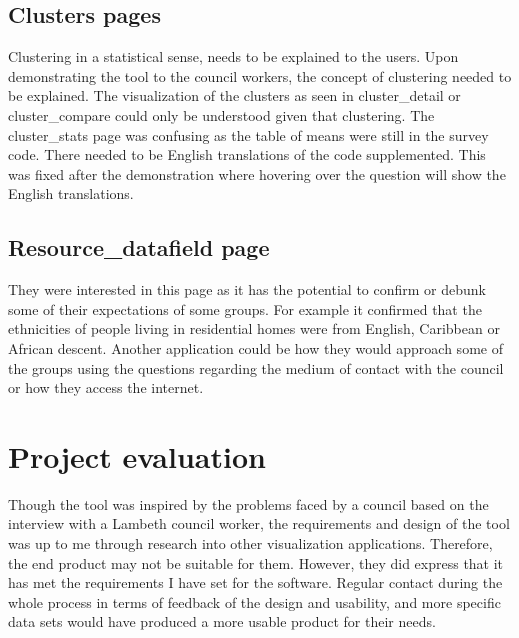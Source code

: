 \subsection{Clusters pages}

Clustering in a statistical sense, needs to be explained to the users. Upon demonstrating the tool to the council workers, the concept of clustering needed to be explained. The visualization of the clusters as seen in cluster\_detail or cluster\_compare could only be understood given that clustering.
The cluster\_stats page was confusing as the table of means were still in the survey code. There needed to be English translations of the code supplemented. This was fixed after the demonstration where hovering over the question will show the English translations.

\subsection{Resource\_datafield page}
They were interested in this page as it has the potential to confirm or debunk some of their expectations of some groups. For example it confirmed that the ethnicities of people living in residential homes were from English, Caribbean or African descent. Another application could be how they would approach some of the groups using the questions regarding the medium of contact with the council or how they access the internet.

\section{Project evaluation}

Though the tool was inspired by the problems faced by a council based on the interview with a Lambeth council worker, the requirements and design of the tool was up to me through research into other visualization applications. Therefore, the end product may not be suitable for them. However, they did express that it has met the requirements I have set for the software. Regular contact during the whole process in terms of feedback of the design and usability, and more specific data sets would have produced a more usable product for their needs.
